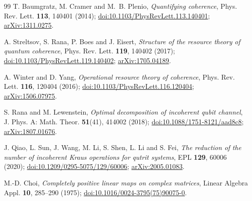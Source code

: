 \documentclass[11pt,a4paper]{article}
\theoremstyle{definition}
\theoremstyle{plain}
\begin{document}
\begingroup\small
\begin{thebibliography}{99}
\setlength{\itemsep}{2pt}
T. Baumgratz, M. Cramer and M.~B. Plenio,
\emph{Quantifying coherence},
Phys. Rev. Lett. \textbf{113}, 140401 (2014);
\href{https://doi.org/10.1103/PhysRevLett.113.140401}{doi:10.1103/PhysRevLett.113.140401};
\href{https://arxiv.org/abs/1311.0275}{arXiv:1311.0275}.

A. Streltsov, S. Rana, P. Boes and J. Eisert,
\emph{Structure of the resource theory of quantum coherence},
Phys. Rev. Lett. \textbf{119}, 140402 (2017);
\href{https://doi.org/10.1103/PhysRevLett.119.140402}{doi:10.1103/PhysRevLett.119.140402};
\href{https://arxiv.org/abs/1705.04189}{arXiv:1705.04189}.

A. Winter and D. Yang,
\emph{Operational resource theory of coherence},
Phys. Rev. Lett. \textbf{116}, 120404 (2016);
\href{https://doi.org/10.1103/PhysRevLett.116.120404}{doi:10.1103/PhysRevLett.116.120404};
\href{https://arxiv.org/abs/1506.07975}{arXiv:1506.07975}.

S. Rana and M. Lewenstein,
\emph{Optimal decomposition of incoherent qubit channel},
J. Phys. A: Math. Theor. \textbf{51}(41), 414002 (2018);
\href{https://doi.org/10.1088/1751-8121/aad8c8}{doi:10.1088/1751-8121/aad8c8};
\href{https://arxiv.org/abs/1807.01676}{arXiv:1807.01676}.

J. Qiao, L. Sun, J. Wang, M. Li, S. Shen, L. Li and S. Fei,
\emph{The reduction of the number of incoherent Kraus operations for qutrit
systems},
EPL \textbf{129}, 60006 (2020);
\href{https://doi.org/10.1209/0295-5075/129/60006}{doi:10.1209/0295-5075/129/60006};
\href{https://arxiv.org/abs/2005.01083}{arXiv:2005.01083}.

M.-D. Choi,
\emph{Completely positive linear maps on complex matrices},
Linear Algebra Appl. \textbf{10}, 285--290 (1975);
\href{https://doi.org/10.1016/0024-3795(75)90075-0}{doi:10.1016/0024-3795(75)90075-0}.

\end{thebibliography}
\endgroup
\end{document}
